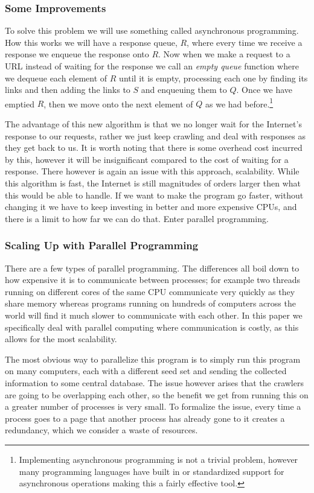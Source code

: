 \documentclass{article}
\begin{document}
	\subsubsection{Some Improvements}
	To solve this problem we will use something called asynchronous programming. How this works we will have a response queue, $R$, where every time we receive a response we enqueue the response onto $R$. Now when we make a request to a URL instead of waiting for the response we call an \textit{empty queue} function where we dequeue each element of $R$ until it is empty, processing each one by finding its links and then adding the links to $S$ and enqueuing them to $Q$. Once we have emptied $R$, then we move onto the next element of $Q$ as we had before.\footnote{Implementing asynchronous programming is not a trivial problem, however many programming languages have built in or standardized support for asynchronous operations making this a fairly effective tool.}
	
	The advantage of this new algorithm is that we no longer wait for the Internet's response to our requests, rather we just keep crawling and deal with responses as they get back to us. It is worth noting that there is some overhead cost incurred by this, however it will be insignificant compared to the cost of waiting for a response. There however is again an issue with this approach, scalability. While this algorithm is fast, the Internet is still magnitudes of orders larger then what this would be able to handle. If we want to make the program go faster, without changing it we have to keep investing in better and more expensive CPUs, and there is a limit to how far we can do that. Enter parallel programming.
	
	\subsubsection{Scaling Up with Parallel Programming}
	There are a few types of parallel programming. The differences all boil down to how expensive it is to communicate between processes; for example two threads running on different cores of the same CPU communicate very quickly as they share memory whereas programs running on hundreds of computers across the world will find it much slower to communicate with each other. In this paper we specifically deal with parallel computing where communication is costly, as this allows for the most scalability.
	
	The most obvious way to parallelize this program is to simply run this program on many computers, each with a different seed set and sending the collected information to some central database. The issue however arises that the crawlers are going to be overlapping each other, so the benefit we get from running this on a greater number of processes is very small. To formalize the issue, every time a process goes to a page that another process has already gone to it creates a redundancy, which we consider a waste of resources.
	
\end{document}
